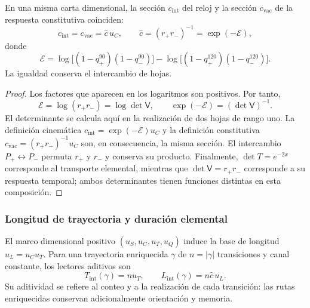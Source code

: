 \begin{proposition}
\label{v:v:prop:identidad-velocidad}
En una misma carta dimensional, la sección $c_{\mathrm{int}}$ del reloj
y la sección $c_{\mathrm{vac}}$ de la respuesta constitutiva coinciden:
\begin{equation}
 c_{\mathrm{int}}=c_{\mathrm{vac}}
   =\widehat c\,u_C,
 \qquad
 \widehat c=(r_+r_-)^{-1}
            =\exp(-\mathcal E),
 \label{v:v:eq:identidad-velocidad}
\end{equation}
donde
\begin{equation}
 \mathcal E=
 \log\!\bigl[(1-q_+^{90})(1-q_-^{90})\bigr]
 -\log\!\bigl[(1-q_+^{120})(1-q_-^{120})\bigr].
 \label{v:v:eq:velocidad-lector-simetrico}
\end{equation}
La igualdad conserva el intercambio de hojas.
\end{proposition}
\begin{proof}
Los factores que aparecen en los logaritmos son positivos. Por tanto,
\[
 \mathcal E=\log(r_+r_-)
            =\log\det\mathsf V,
 \qquad \exp(-\mathcal E)=(\det\mathsf V)^{-1}.
\]
El determinante se calcula aquí en la realización de dos hojas de rango
uno. La definición cinemática $c_{\mathrm{int}}=\exp(-\mathcal E)u_C$
y la definición constitutiva $c_{\mathrm{vac}}=(r_+r_-)^{-1}u_C$
son, en consecuencia, la misma sección. El intercambio $P_+\leftrightarrow
P_-$ permuta $r_+$ y $r_-$ y conserva su producto. Finalmente,
$\det T=e^{-2x}$ corresponde al transporte elemental, mientras que
$\det\mathsf V=r_+r_-$ corresponde a su respuesta temporal; ambos
determinantes tienen funciones distintas en esta composición.
\end{proof}

\subsubsection{Longitud de trayectoria y duración elemental}

El marco dimensional positivo $(u_S,u_C,u_T,u_Q)$ induce la base de
longitud $u_L=u_Cu_T$. Para una trayectoria enriquecida $\gamma$ de
$n=|\gamma|$ transiciones y canal constante, los lectores aditivos son
\begin{equation}
 T_{\mathrm{int}}(\gamma)=n u_T,
 \qquad L_{\mathrm{int}}(\gamma)=n\widehat c\,u_L.
 \label{v:v:eq:velocidad-longitud-reloj}
\end{equation}
Su aditividad se refiere al conteo y a la realización de cada transición:
las rutas enriquecidas conservan adicionalmente orientación y memoria.

